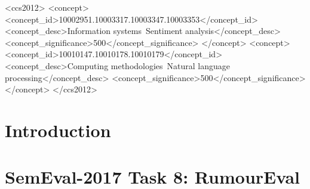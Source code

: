 \documentclass[sigconf]{acmart}
\begin{document}
%
%
\begin{CCSXML}
<ccs2012>
<concept>
<concept_id>10002951.10003317.10003347.10003353</concept_id>
<concept_desc>Information systems~Sentiment analysis</concept_desc>
<concept_significance>500</concept_significance>
</concept>
<concept>
<concept_id>10010147.10010178.10010179</concept_id>
<concept_desc>Computing methodologies~Natural language processing</concept_desc>
<concept_significance>500</concept_significance>
</concept>
</ccs2012>
\end{CCSXML}





\maketitle

%


\section{Introduction}

\section{SemEval-2017 Task 8: RumourEval} \label{sec:dataset}
\end{document}
